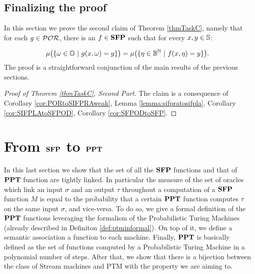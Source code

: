 \subsection{Finalizing the proof}
\label{sub:finalizing}

In this section we prove the second claim of Theorem \ref{thmTaskC},
namely that for each $g\in \mathcal{POR}$, there is an  $f \in \mathbf{SFP}$ such that for every $x,y\in \mathbb{S}$:

$$
\mu\big(\{\omega \in \Os \ | \ g(x,\omega) = y\}\big) = \mu\big(\{\eta \in \Bool^\Nat \ | \  f(x, \eta) = y\}\big).
$$
%
The proof is a straightforward conjunction
of the main results of the previous sections.


\begin{proof}[Proof of Theorem \ref{thmTaskC}, Second Part]
  The claim is a consequence of Corollary \ref{cor:PORtoSIFPRAweak}, Lemma \ref{lemma:sifpratosifpla}, Corollary \ref{cor:SIFPLAtoSFPOD}, Corollary \ref{cor:SFPODtoSFP}.
\end{proof}



















\section{From $\mathbf{SFP}$ to $\mathbf{PPT}$}
\label{sub:SFPtoPPT}

In this last section we show that the set of all the $\mathbf{SFP}$ functions
and that of $\mathbf{PPT}$ function are tightly linked. In particular
the measure of the set of oracles which link an input $\sigma$ and an
output $\tau$ throughout a computation of a $\mathbf{SFP}$ function $M$ is equal
to the probability that
a certain $\mathbf{PPT}$ function computes $\tau$ on the same input $\sigma$, and vice-versa.
%
To do so, we give a formal definition of the $\mathbf{PPT}$ functions leveraging the formalism
of the Probabilistic Turing Machines (already described in Definiton \ref{def:ptminformal}). On top of it, we define a semantic association a function to each machine. Finally, $\mathbf{PPT}$ is basically defined as
the set of functions computed by a Probabilistic Turing Machine in a polynomial number of steps.
After that, we show that there
is a bijection between the class of Stream  machines and PTM
with the property we are aiming to.
%

